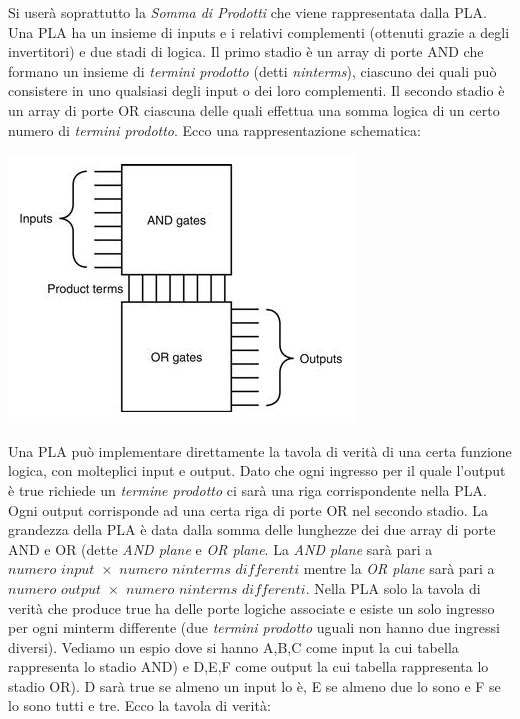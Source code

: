 \documentclass[a4paper,12pt, oneside]{book}
\begin{document}
\begin{itemize}
Si userà soprattutto la \textit{Somma di Prodotti} che viene rappresentata dalla PLA. Una PLA ha un insieme di inputs e i relativi complementi (ottenuti grazie a degli invertitori) e due stadi di logica. Il primo stadio è un array di porte AND che formano un insieme di \textit{termini prodotto} (detti \textit{ninterms}), ciascuno dei quali può consistere in uno qualsiasi degli input o dei loro complementi. Il secondo stadio è un array di porte OR ciascuna delle quali effettua una somma logica di un certo numero di \textit{termini prodotto}. Ecco una rappresentazione schematica:\\
\begin{center}\includegraphics[scale=0.65]{img/pla.png}\end{center}
Una PLA può implementare direttamente la tavola di verità di una certa funzione logica, con molteplici input e output. Dato che ogni ingresso per il quale l'output è true richiede un \textit{termine prodotto} ci sarà una riga corrispondente nella PLA. Ogni output corrisponde ad una certa riga di porte OR nel secondo stadio. La grandezza della PLA è data dalla somma delle lunghezze dei due array di porte AND e OR (dette \textit{AND plane} e \textit{OR plane}. La \textit{AND plane} sarà pari a $numero\,\, input\,\, \times \,\, numero\,\, ninterms\,\, differenti$ mentre la \textit{OR plane} sarà pari a $numero\,\, output\,\, \times \,\, numero\,\, ninterms\,\, differenti$. Nella PLA solo la tavola di verità che produce true ha delle porte logiche associate e esiste un solo ingresso per ogni minterm differente (due \textit{termini prodotto} uguali non hanno due ingressi diversi).
\newpage
 Vediamo un espio dove si hanno A,B,C come input la cui tabella rappresenta lo stadio AND) e D,E,F come output la cui tabella rappresenta lo stadio OR). D sarà true se almeno un input lo è, E se almeno due lo sono e F se lo sono tutti e tre. Ecco la tavola di verità:\\

\end{itemize}
\end{document}
